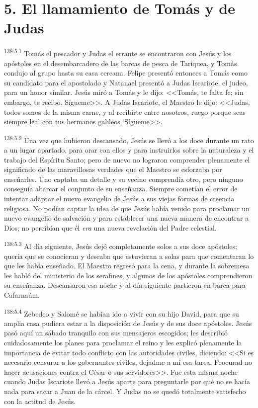 \section*{5. El llamamiento de Tomás y de Judas}
\par 
\textsuperscript{138:5.1} Tomás el pescador y Judas el errante se encontraron con Jesús y los apóstoles en el desembarcadero de las barcas de pesca de Tariquea, y Tomás condujo al grupo hasta su casa cercana. Felipe presentó entonces a Tomás como su candidato para el apostolado y Natanael presentó a Judas Iscariote, el judeo, para un honor similar. Jesús miró a Tomás y le dijo: <<Tomás, te falta fe; sin embargo, te recibo. Sígueme>>. A Judas Iscariote, el Maestro le dijo: <<Judas, todos somos de la misma carne, y al recibirte entre nosotros, ruego porque seas siempre leal con tus hermanos galileos. Sígueme>>.

\par 
\textsuperscript{138:5.2} Una vez que hubieron descansado, Jesús se llevó a los doce durante un rato a un lugar apartado, para orar con ellos y para instruirlos sobre la naturaleza y el trabajo del Espíritu Santo; pero de nuevo no lograron comprender plenamente el significado de las maravillosas verdades que el Maestro se esforzaba por enseñarles. Uno captaba un detalle y su vecino comprendía otro, pero ninguno conseguía abarcar el conjunto de su enseñanza. Siempre cometían el error de intentar adaptar el nuevo evangelio de Jesús a sus viejas formas de creencia religiosa. No podían captar la idea de que Jesús había venido para proclamar un nuevo evangelio de salvación y para establecer una nueva manera de encontrar a Dios; no percibían que él \textit{era} una nueva revelación del Padre celestial.

\par 
\textsuperscript{138:5.3} Al día siguiente, Jesús dejó completamente solos a sus doce apóstoles; quería que se conocieran y deseaba que estuvieran a solas para que comentaran lo que les había enseñado. El Maestro regresó para la cena, y durante la sobremesa les habló del ministerio de los serafines, y algunos de los apóstoles comprendieron su enseñanza. Descansaron esa noche y al día siguiente partieron en barca para Cafarnaúm.

\par 
\textsuperscript{138:5.4} Zebedeo y Salomé se habían ido a vivir con su hijo David, para que su amplia casa pudiera estar a la disposición de Jesús y de sus doce apóstoles. Jesús pasó aquí un sábado tranquilo con sus mensajeros escogidos; les describió cuidadosamente los planes para proclamar el reino y les explicó plenamente la importancia de evitar todo conflicto con las autoridades civiles, diciendo: <<Si es necesario censurar a los gobernantes civiles, dejadme a mí esa tarea. Procurad no hacer acusaciones contra el César o sus servidores>>. Fue esta misma noche cuando Judas Iscariote llevó a Jesús aparte para preguntarle por qué no se hacía nada para sacar a Juan de la cárcel. Y Judas no se quedó totalmente satisfecho con la actitud de Jesús.

